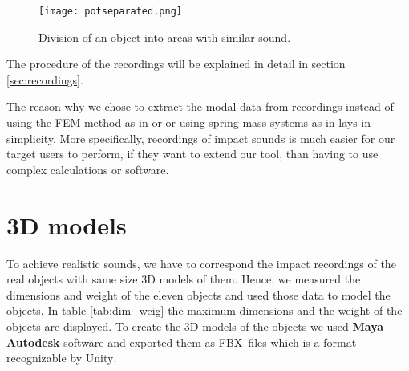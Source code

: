 \begin{figure}[H]
  \centering
    \texttt{[image: potseparated.png]}
      \caption{Division of an object into areas with similar sound.}
      \label{fig:pot_sep}
\end{figure} 

The procedure of the recordings will be explained in detail in section \ref{sec:recordings}.

The reason why we chose to extract the modal data from recordings instead of using the FEM method as in \cite{director2001synthesizing} or \cite{o2002synthesizing} or using spring-mass systems as in \cite{raghuvanshi2006interactive} lays in simplicity. More specifically, recordings of impact sounds is much easier for our target users to perform, if they want to extend our tool, than having to use complex calculations or software.

\section{3D models}
To achieve realistic sounds, we have to correspond the impact recordings of the real objects with same size 3D models of them. Hence, we measured the dimensions and weight of the eleven objects and used those data to model the objects. In table \ref{tab:dim_weig} the maximum dimensions and the weight of the objects are displayed. To create the 3D models of the objects we used \textbf{Maya Autodesk} software \cite{bib:maya} and exported them as FBX\textsuperscript\textregistered\ files \cite{bib:fbx} which is a format recognizable by Unity\textsuperscript{\textregistered}.

